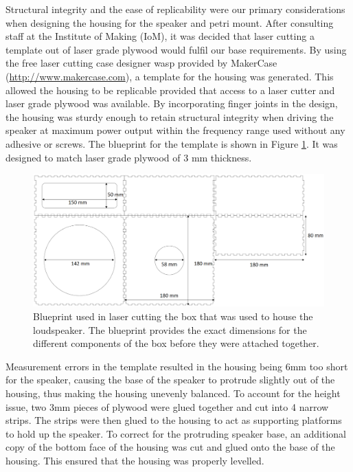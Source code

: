 Structural integrity and the ease of replicability were our primary considerations when designing the housing for the speaker and petri mount. After consulting staff at the Institute of Making (IoM), it was decided that laser cutting a template out of laser grade plywood would fulfil our base requirements. By using the free laser cutting case designer wasp provided by MakerCase (\url{http://www.makercase.com}), a template for the housing was generated. This allowed the housing to be replicable provided that access to a laser cutter and laser grade plywood was available. By incorporating finger joints in the design, the housing was sturdy enough to retain structural integrity when driving the speaker at maximum power output within the frequency range used without any adhesive or screws. The blueprint for the template is shown in Figure \ref{fig:blueprint}. It was designed to match laser grade plywood of 3 mm thickness.

\begin{figure}[htbp]
\includegraphics[width=\textwidth]{prototype/exp_rep_imgs/Blueprint.png}
\centering
\caption{Blueprint used in laser cutting the box that was used to house the loudspeaker. The blueprint provides the exact dimensions for the different components of the box before they were attached together.  }
\centering
\label{fig:blueprint}
\end{figure}

Measurement errors in the template resulted in the housing being 6mm too short for the speaker, causing the base of the speaker to protrude slightly out of the housing, thus making the housing unevenly balanced. To account for the height issue, two 3mm pieces of plywood were glued together and cut into 4 narrow strips. The strips were then glued to the housing to act as supporting platforms to hold up the speaker. To correct for the protruding speaker base, an additional copy of the bottom face of the housing was cut and glued onto the base of the housing. This ensured that the housing was properly levelled.

